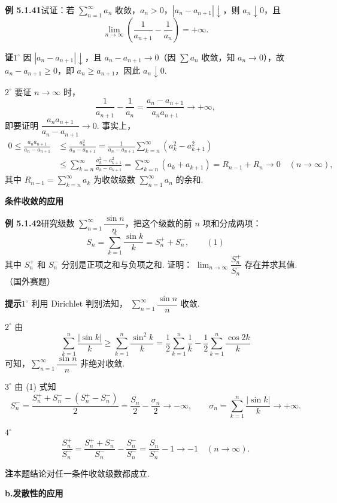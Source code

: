 \documentclass[UTF8, 12pt, fontset=fandol, oneside]{ctexart}
\begin{document}
\noindent\textbf{例 5.1.41}\quad 试证：若 $\displaystyle\sum_{n=1}^{\infty}a_n$ 收敛，$a_n>0$，$|a_n-a_{n+1}|\downarrow$，则 $a_n\downarrow0$，且
\[
  \lim_{n\to\infty}\left(\frac1{a_{n+1}}-\frac1{a_n}\right)=+\infty.
\]

\noindent\textbf{证}\quad $1^\circ$ 因 $|a_n-a_{n+1}|\downarrow$，且 $a_n-a_{n+1}\to0$（因 $\sum a_n$ 收敛，知 $a_n\to0$），故 $a_n-a_{n+1}\ge0$，即 $a_n\ge a_{n+1}$，因此 $a_n\downarrow0$.

$2^\circ$ 要证 $n\to\infty$ 时，
\[
  \frac1{a_{n+1}}-\frac1{a_n}
  =\frac{a_n-a_{n+1}}{a_na_{n+1}}\to+\infty,
\]
即要证明 $\dfrac{a_na_{n+1}}{a_n-a_{n+1}}\to0$. 事实上，
\[
\begin{aligned}
0\le\frac{a_na_{n+1}}{a_n-a_{n+1}}
&\le\frac{a_n^2}{a_n-a_{n+1}}
=\frac1{a_n-a_{n+1}}\sum_{k=n}^{\infty}(a_k^2-a_{k+1}^2)\\
&\le\sum_{k=n}^{\infty}\frac{a_k^2-a_{k+1}^2}{a_k-a_{k+1}}
=\sum_{k=n}^{\infty}(a_k+a_{k+1})
=R_{n-1}+R_n\to0\quad(n\to\infty),
\end{aligned}
\]
其中 $R_{n-1}=\displaystyle\sum_{k=n}^{\infty}a_k$ 为收敛级数
$\displaystyle\sum_{n=1}^{\infty}a_n$ 的余和.

\noindent\textbf{条件收敛的应用}

\noindent\textbf{例 5.1.42}\quad 研究级数
$\displaystyle\sum_{n=1}^{\infty}\dfrac{\sin n}{n}$，把这个级数的前 $n$ 项和分成两项：
\[
  S_n=\sum_{k=1}^n\frac{\sin k}{k}=S_n^++S_n^-,
\qquad(1)
\]
其中 $S_n^+$ 和 $S_n^-$ 分别是正项之和与负项之和. 证明：
$\displaystyle\lim_{n\to\infty}\dfrac{S_n^+}{S_n^-}$ 存在并求其值.（国外赛题）

\noindent\textbf{提示}\quad $1^\circ$ 利用 Dirichlet 判别法知，
$\displaystyle\sum_{n=1}^{\infty}\dfrac{\sin n}{n}$ 收敛.

$2^\circ$ 由
\[
  \sum_{k=1}^n\frac{|\sin k|}{k}
  \ge\sum_{k=1}^n\frac{\sin^2 k}{k}
  =\frac12\sum_{k=1}^n\frac1k-\frac12\sum_{k=1}^n\frac{\cos2k}{k}
\]
可知，$\displaystyle\sum_{n=1}^{\infty}\dfrac{\sin n}{n}$ 非绝对收敛.

$3^\circ$ 由 (1) 式知
\[
  S_n^-=\frac{S_n^++S_n^--(S_n^+-S_n^-)}2
  =\frac{S_n}2-\frac{\sigma_n}2\to-\infty,
  \qquad \sigma_n=\sum_{k=1}^n\frac{|\sin k|}{k}\to+\infty.
\]

$4^\circ$
\[
  \frac{S_n^+}{S_n^-}
  =\frac{S_n^++S_n^-}{S_n^-}-\frac{S_n^-}{S_n^-}
  =\frac{S_n}{S_n^-}-1\to-1\quad(n\to\infty).
\]

\noindent\textbf{注}\quad 本题结论对任一条件收敛级数都成立.

\noindent\textbf{b.\quad 发散性的应用}
\end{document}
